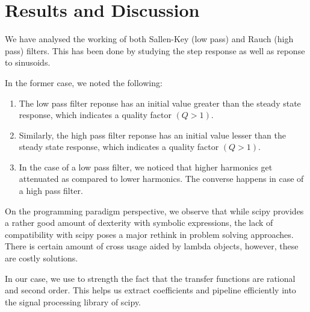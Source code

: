 \documentclass[10pt,notitlepage,onecolumn,aps,pra]{revtex4-1}
\begin{document}
    \hypertarget{results-and-discussion}{%
\section{Results and Discussion}\label{results-and-discussion}}

We have analysed the working of both Sallen-Key (low pass) and Rauch
(high pass) filters. This has been done by studying the step response as
well as reponse to sinusoids.

In the former case, we noted the following:

\begin{enumerate}
\def\labelenumi{\arabic{enumi}.}
\item
  The low pass filter reponse has an initial value greater than the
  steady state response, which indicates a quality factor \((Q>1)\).
\item
  Similarly, the high pass filter reponse has an initial value lesser
  than the steady state response, which indicates a quality factor
  \((Q>1)\).
\item
  In the case of a low pass filter, we noticed that higher harmonics get
  attenuated as compared to lower harmonics. The converse happens in
  case of a high pass filter.
\end{enumerate}

On the programming paradigm perspective, we observe that while scipy
provides a rather good amount of dexterity with symbolic expressions,
the lack of compatibility with scipy poses a major rethink in problem
solving approaches. There is certain amount of cross usage aided by
lambda objects, however, these are costly solutions.

In our case, we use to strength the fact that the transfer functions are
rational and second order. This helps us extract coefficients and
pipeline efficiently into the signal processing library of scipy.


    
    


    
    
\end{document}
